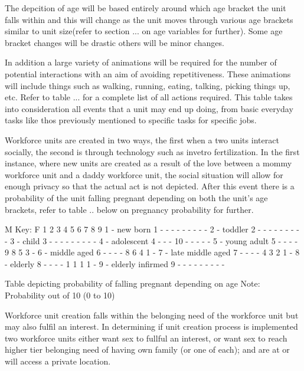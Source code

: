 The depcition of age will be based entirely around which age bracket the unit falls within and this will change as the unit moves through various age brackets similar to unit size(refer to section ... on age variables for further). Some age bracket changes will be drastic others will be minor changes.

In addition a large variety of animations will be required for the number of potential interactions with an aim of avoiding repetitiveness. These animations will include things such as walking, running, eating, talking, picking things up, etc. Refer to table ... for a complete list of all actions required. This table takes into consideration all events that a unit may end up doing, from basic everyday tasks like thos previously mentioned to specific tasks for specific jobs. 

Workforce units are created in two ways, the first when a two units interact socially, the second is through technology such as invetro fertilization. In the first instance, where new units are created as a result of the love between a mommy workforce unit and a daddy workforce unit, the social situation will allow for enough privacy so that the actual act is not depicted. After this event there is a probability of the unit falling pregnant depending on both the unit's age brackets, refer to table .. below on pregnancy probability for further. 

  M			        Key:
F 1  2  3  4  5  6  7  8  9     1 - new born
1 -  -  -  -  -  -  -  -  -     2 - toddler
2 -  -  -  -  -  -  -  -  -     3 - child
3 -  -  -  -  -  -  -  -  -     4 - adolescent
4 -  -  - 10  -  -  -  -  -     5 - young adult
5 -  -  -  -  9  8  5  3  -     6 - middle aged
6 -  -  -  -  8  6  4  1  -     7 - late middle aged
7 -  -  -  -  4  3  2  1  -     8 - elderly 
8 -  -  -  -  1  1  1  1  -     9 - elderly infirmed
9 -  -  -  -  -  -  -  -  -     

Table depicting probability of falling pregnant depending on age
Note: Probability out of 10 (0 to 10)

Workforce unit creation falls within the belonging need of the workforce unit but may also fulfil an interest. In determining if unit creation process is implemented two workforce units either want sex to fullful an interest, or want sex to reach higher tier belonging need of having own family (or one of each); and are at or will access a private location.

